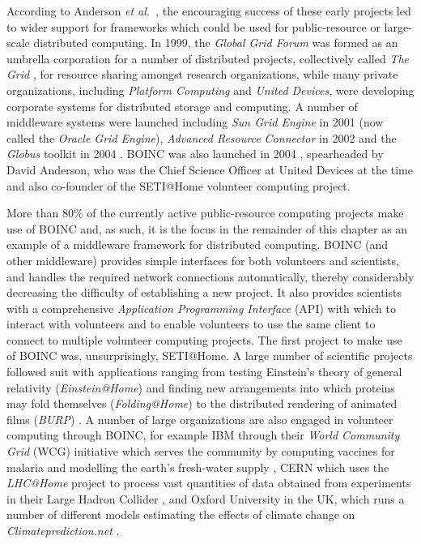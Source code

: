 According to Anderson \emph{et al.\ }\cite{anderson:seti2002}, the encouraging success of these early projects led to  wider support for frameworks which could be used for public-resource or large-scale distributed computing. In 1999, the \emph{Global Grid Forum} was formed as an umbrella corporation for a number of distributed projects, collectively called \emph{The Grid} \cite{fostergrid}, for resource sharing amongst research organizations, while many private organizations, including \emph{Platform Computing} and \emph{United Devices}, were developing corporate systems for distributed storage and computing. A number of middleware systems were launched including \emph{Sun Grid Engine} in 2001 \cite{oracle} (now called the \emph{Oracle Grid Engine}), \emph{Advanced Resource Connector} in 2002 \cite{arc} and the \emph{Globus} toolkit in 2004 \cite{globus}. BOINC was also launched in 2004 \cite{anderson2004boinc}, spearheaded by David Anderson, who was the Chief Science Officer   at United Devices at the time and also co-founder of the SETI@Home volunteer computing project. 

More than 80\% of the currently active public-resource computing projects make use of BOINC and, as such, it is the focus in the remainder of this chapter as an example of a middleware framework for distributed computing. BOINC (and other middleware) provides simple interfaces for both volunteers and scientists, and handles the required network connections automatically, thereby considerably decreasing the difficulty of establishing a new project. It also  provides scientists with a comprehensive \emph{Application Programming Interface} (API) with which to interact with volunteers and to enable volunteers to use the same client to connect to multiple volunteer computing projects. The first project to make use of BOINC was, unsurprisingly, SETI@Home. A large number of scientific projects followed suit with applications ranging from testing Einstein's theory of general relativity (\emph{Einstein@Home}) \cite{eah} and finding new arrangements into which proteins may fold themselves (\emph{Folding@Home}) \cite{fah} to the distributed rendering of animated films (\emph{BURP}) \cite{burp}.
A number of large organizations are  also engaged in volunteer computing through BOINC, for example    IBM through their \emph{World Community Grid} (WCG) initiative which serves the community by computing vaccines for malaria and modelling the earth's fresh-water supply \cite{wcg}, CERN which uses the \emph{LHC@Home} project to process  vast quantities of data obtained from experiments in their {Large Hadron Collider} \cite{lhcah}, and Oxford University in the UK, which  runs a number of different models estimating the effects of climate change on \emph{Climateprediction.net} \cite{cpdn}.  

